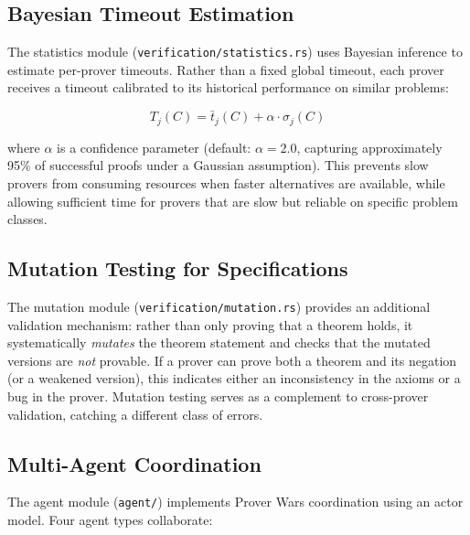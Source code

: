 \documentclass[11pt,a4paper]{article}
\begin{document}
\subsection{Bayesian Timeout Estimation}

The statistics module (\texttt{verification/statistics.rs}) uses Bayesian
inference to estimate per-prover timeouts. Rather than a fixed global timeout,
each prover receives a timeout calibrated to its historical performance on
similar problems:

\begin{equation}
T_j(C) = \bar{t}_j(C) + \alpha \cdot \sigma_j(C)
\label{eq:timeout}
\end{equation}

where $\alpha$ is a confidence parameter (default: $\alpha = 2.0$, capturing
approximately 95\% of successful proofs under a Gaussian assumption). This
prevents slow provers from consuming resources when faster alternatives are
available, while allowing sufficient time for provers that are slow but
reliable on specific problem classes.

\subsection{Mutation Testing for Specifications}

The mutation module (\texttt{verification/mutation.rs}) provides an additional
validation mechanism: rather than only proving that a theorem holds, it
systematically \emph{mutates} the theorem statement and checks that the
mutated versions are \emph{not} provable. If a prover can prove both a
theorem and its negation (or a weakened version), this indicates either
an inconsistency in the axioms or a bug in the prover. Mutation testing
serves as a complement to cross-prover validation, catching a different
class of errors.

\subsection{Multi-Agent Coordination}

The agent module (\texttt{agent/}) implements Prover Wars coordination using
an actor model. Four agent types collaborate:
\end{document}
